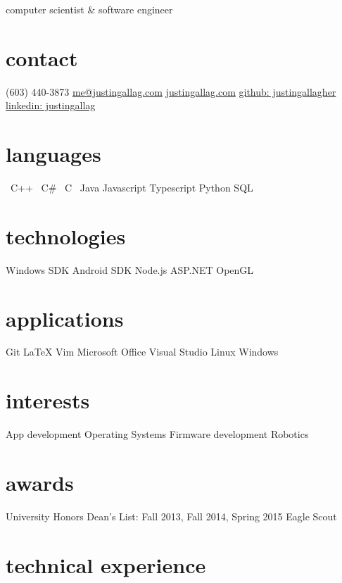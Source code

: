 \documentclass[print]{template/friggeri-cv}
\newcommand{\starr}{\raisebox{0.2ex}{$\star $}}
\begin{document}
    {computer scientist \& software engineer}

    \begin{aside}
        \section{contact}
            (603) 440-3873
            \href{mailto:me@justingallag.com}{me@justingallag.com}
            \href{http://justingallag.com}{justingallag.com}
            \href{https://github.com/justingallagher}{github: justingallagher}
            \href{https://www.linkedin.com/in/justingallag}{linkedin: justingallag}
        \section{languages}
            \starr \ C++
            \starr \ C\#
            \starr \ C
            \starr \ Java
            Javascript
            Typescript
            Python
            SQL
        \section{technologies}
            Windows SDK
            Android SDK
            Node.js
            ASP.NET
            OpenGL
        \section{applications}
            Git
            LaTeX
            Vim
            Microsoft Office
            Visual Studio
            Linux
            Windows
        \section{interests}
            App development
            Operating Systems
            Firmware development
            Robotics
        \section{awards}
            University Honors
            Dean's List: Fall 2013, Fall 2014, Spring 2015
            Eagle Scout
    \end{aside}

    \section{technical experience}
\end{document}
